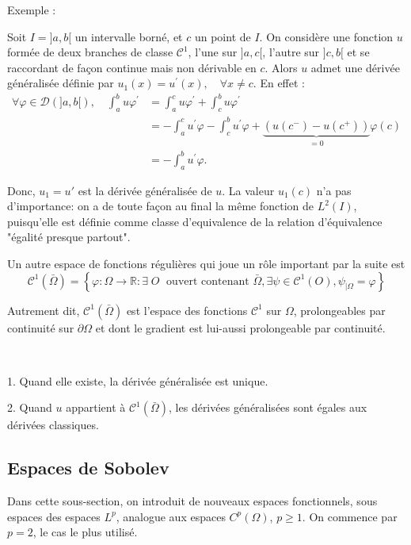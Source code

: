 Exemple : 

Soit $I=] a, b[$ un intervalle borné, et $c$ un point de $I$. On considère une fonction $u$ formée de deux branches de classe $\mathcal{C}^{1}$,  l'une sur $] a, c[$,  l'autre sur 
$] c, b[$ et se raccordant de  façon continue mais non dérivable en $c$. Alors $u$ admet une dérivée généralisée définie par $u_{1}(x)=u^{\prime}(x),   \quad \forall x \neq c$. 
 En effet :
\begin{align*}
	\forall \varphi \in \mathcal{D}(]a, b[),  \quad \int_{a}^{b} u \varphi^{\prime}&=\int_{a}^{c}u \varphi^{\prime}+\int_{c}^{b}u \varphi^{\prime}\\
	&=-\int_{a}^{c} u^{\prime} \varphi-\int_{c}^{b} u^{\prime} \varphi+\underbrace{\left(u\left(c^{-}\right)-u\left(c^{+}\right)\right)}_{=0} \varphi(c)\\
	&=-\int_{a}^{b} u^{\prime} \varphi.
\end{align*}

Donc, $u_1=u'$ est la dérivée généralisée de $u$. 
 La valeur $u_{1}(c)$ n'a pas d'importance: on a de toute façon au final la même fonction de $L^{2}(I)$, puisqu'elle est définie comme classe d'equivalence de la relation d'équivalence "égalité presque partout".

Un autre espace de fonctions régulières qui joue un rôle important par la suite est  
$$
\mathcal{C}^{1}(\bar{\Omega})=\left\{\varphi: \Omega \rightarrow \mathbb{R} : \exists \; O \; \text { ouvert contenant } \bar{\Omega}, \exists \psi \in \mathcal{C}^{1}(O), \psi_{\mid \Omega}=\varphi\right\}
$$

Autrement dit, $\mathcal{C}^{1}(\bar{\Omega})$ est l'espace des fonctions $\mathcal{C}^{1}$ sur $\Omega$, prolongeables par continuité sur $\partial \Omega$ et dont le gradient est lui-aussi prolongeable par continuité. 


\begin{theorem}\
	
1. 	 Quand elle existe, la dérivée généralisée est unique.

 2. Quand $u$ appartient  à $\mathcal{C}^{1}(\bar{\Omega})$, les dérivées généralisées sont  égales  aux  dérivées classiques.
\end{theorem}

\subsection{Espaces de Sobolev}

Dans cette sous-section,  on introduit  de nouveaux espaces fonctionnels, sous espaces des espaces  $L^p$, analogue aux espaces $C^p(\Omega)$, $p\geq 1$.   On commence par  $p=2$, le  cas le plus  utilisé. 
